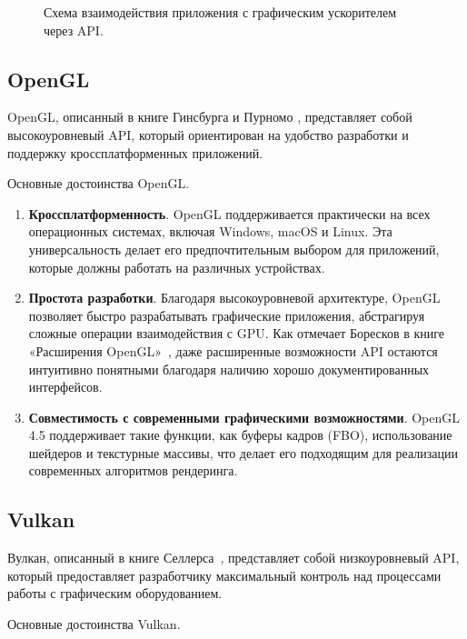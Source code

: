 \begin{figure}[h!]
    \centering
    
    \caption{Схема взаимодействия приложения с графическим ускорителем через API.}
    \label{img:cpu_gpu_interaction}
\end{figure}

\subsection{OpenGL}

OpenGL, описанный в книге Гинсбурга и Пурномо \cite{OpenGLES},
представляет собой высокоуровневый API,
который ориентирован на удобство разработки и поддержку кроссплатформенных приложений.

Основные достоинства OpenGL.

\begin{enumerate}[label=\arabic*), labelsep=0.5em]
    \item \textbf{Кроссплатформенность}. OpenGL поддерживается практически на всех операционных системах,
    включая Windows, macOS и Linux.
    Эта универсальность делает его предпочтительным выбором для приложений,
    которые должны работать на различных устройствах.
    \item \textbf{Простота разработки}. Благодаря высокоуровневой архитектуре,
    OpenGL позволяет быстро разрабатывать графические приложения,
    абстрагируя сложные операции взаимодействия с GPU.
    Как отмечает Боресков в книге «Расширения OpenGL»~\cite{extOpenGL},
    даже расширенные возможности API остаются интуитивно понятными благодаря
    наличию хорошо документированных интерфейсов.
    \item \textbf{Совместимость с современными графическими возможностями}.
    OpenGL 4.5 поддерживает такие функции, как буферы кадров (FBO),
    использование шейдеров и текстурные массивы,
    что делает его подходящим для реализации современных алгоритмов рендеринга.
\end{enumerate}

\subsection{Vulkan}

Вулкан, описанный в книге Селлерса~\cite{Vulkan},
представляет собой низкоуровневый API,
который предоставляет разработчику максимальный контроль над процессами работы
с графическим оборудованием.

Основные достоинства Vulkan.

